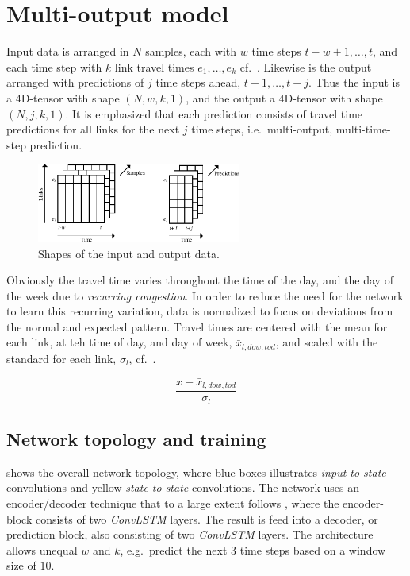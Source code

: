 \documentclass[preprint,12pt]{elsarticle}
\begin{document}
\section{Multi-output model}
\label{sec:model}


Input data is arranged in $N$ samples, each with $w$ time steps $t-w+1, \ldots, t$, and each time step with $k$ link travel times $e_1, \ldots, e_k$ cf.~. Likewise is the output arranged with predictions of $j$ time steps ahead, $t+1, \ldots, t+j$. Thus the input is a 4D-tensor with shape $(N, w, k, 1)$, and the output a 4D-tensor with shape $(N, j, k, 1)$. It is emphasized that each prediction consists of travel time predictions for all links for the next $j$ time steps, i.e.\ multi-output, multi-time-step prediction.
\begin{figure}[!ht]
  \centering
  \includegraphics[width=0.6\textwidth]{drawings/data_shape-crop.pdf}
  \caption{Shapes of the input and output data.}
  \label{fig:data_shape}
\end{figure}

Obviously the travel time varies throughout the time of the day, and the day of the week due to \emph{recurring congestion}. In order to reduce the need for the network to learn this recurring variation, data is normalized to focus on deviations from the normal and expected pattern. Travel times are centered with the mean for each link, at teh time of day, and day of week, $\mathit{\bar{x}_{l,\mathit{dow},\mathit{tod}}}$, and scaled with the standard for each link, $\sigma_l$, cf.\ .

\begin{equation}
  \frac{x - \bar{x}_{l,\mathit{dow},\mathit{tod}}}{\sigma_l}
  \label{eq:normalization}
\end{equation}

\subsection{Network topology and training}
 shows the overall network topology, where blue boxes illustrates \emph{input-to-state} convolutions and yellow \emph{state-to-state} convolutions. The network uses an encoder/decoder technique that to a large extent follows \cite{ConvLSTM}, where the encoder-block consists of two \emph{ConvLSTM} layers. The result is feed into a decoder, or prediction block, also consisting of two \emph{ConvLSTM} layers. The architecture allows unequal $w$ and $k$, e.g.\ predict the next $3$ time steps based on a window size of $10$.
\end{document}
